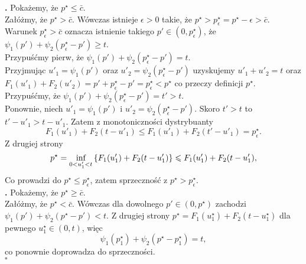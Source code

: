 \documentclass[12pt,a4paper,openany]{book}
\newcommand*{\QEDB}{\hfill\ensuremath{\square}}
\newcommand{\RomanNumeralCaps}[1]
    {\MakeUppercase{\romannumeral #1}}
\begin{document}
\noindent \textbf{\RomanNumeralCaps{1}.}  Pokażemy, że $p^{\star} \leqslant \bar c$.\\
\noindent Załóżmy, że $p^{\star} > \bar c$. Wówczas istnieje $\epsilon > 0$ takie, że $ p^{\star} > p^{\star}_{\epsilon} = p^{\star} - \epsilon > \bar c$. Warunek $p^{\star}_{\epsilon} > \bar c$ oznacza istnienie takiego $p' \in (0,p^{\star}_{\epsilon})$, że  $\psi_{1}(p') + \psi_{2}(p^{\star}_{\epsilon}-p')  \geqslant t$.\\
\noindent Przypuśćmy pierw, że $\psi_{1}(p') + \psi_{2}(p^{\star}_{\epsilon}-p')  = t$.\\
\noindent Przyjmując $u'_{1} = \psi_{1}(p')$ oraz $u'_{2} = \psi_{2}(p^{\star}_{\epsilon}-p')$ uzyskujemy $u'_{1} + u'_{2} = t$ oraz $F_{1}(u'_{1}) + F_{2}(u'_{2}) = p' + p^{\star}_{\epsilon} - p' = p^{\star}_{\epsilon} <  p^{\star}$ co przeczy definicji $ p^{\star}$.\\
\noindent Przypuśćmy, że $\psi_{1}(p') + \psi_{2}(p^{\star}_{\epsilon}-p')  = t' > t$.\\
\noindent Ponownie, niech $u'_{1} = \psi_{1}(p')$ i $u'_{2} = \psi_{2}(p^{\star}_{\epsilon}-p')$. Skoro $t' > t$ to $t' - u'_{1} > t - u'_{1}$. Zatem z monotoniczności dystrybuanty
\begin{equation}
F_{1}(u'_{1}) + F_{2}(t - u'_{1}) \leqslant F_{1}(u'_{1}) + F_{2}(t'-u'_{1}) = p^{\star}_{\epsilon}. \nonumber
\end{equation} 
Z drugiej strony
\begin{equation}
p^{\star} = \underset{0 < u'_{1} < t}{\textnormal{inf}} \left\lbrace F_{1}(u'_{1}) + F_{2}(t -u'_{1}) \right\rbrace \leqslant F_{1}(u'_{1}) + F_{2}(t - u'_{1}), \nonumber
\end{equation} 
Co prowadzi do $p^{\star} \leqslant p^{\star}_{\epsilon}$, zatem sprzeczność z $p^{\star} > p^{\star}_{\epsilon}$.\\
\noindent \textbf{\RomanNumeralCaps{2}.} Pokażemy, że $p^{\star} \geqslant \bar c$.\\
\noindent Załóżmy, że $p^{\star} < \bar c$. Wówczas dla dowolnego $p' \in (0,p^{\star})$ zachodzi $\psi_{1}(p') + \psi_{2}(p^{\star}-p')  < t$. Z drugiej strony $p^{\star} = F_{1}(u^{\star}_{1}) + F_{2}(t-u^{\star}_{1})$ dla pewnego $u_{1}^{\star} \in (0,t)$, więc
\begin{equation}
\psi_{1}(p^{\star}_{1}) + \psi_{2}(p^{\star}-p^{\star}_{1})  = t \nonumber,
\end{equation}
co ponownie doprowadza do sprzeczności.\\
 \phantom{1} \hfill \QEDB
 
\end{document}
